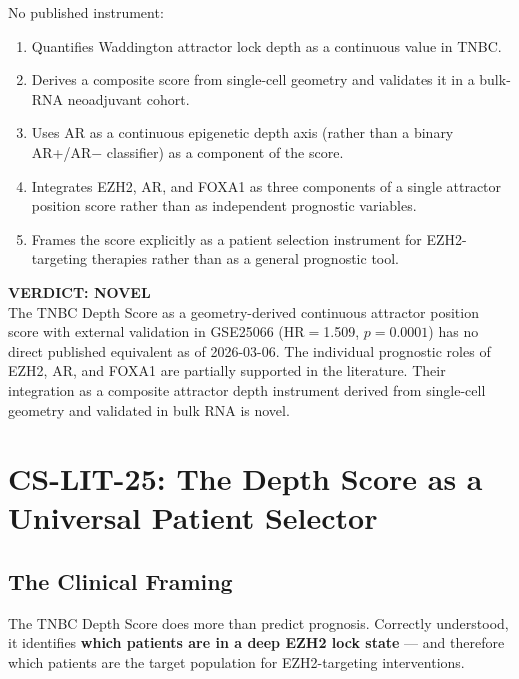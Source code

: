 \documentclass[12pt, a4paper]{article}
\begin{document}
No published instrument:
\begin{enumerate}
    \item Quantifies Waddington attractor lock
    depth as a continuous value in TNBC.
    \item Derives a composite score from
    single-cell geometry and validates it in
    a bulk-RNA neoadjuvant cohort.
    \item Uses AR as a continuous epigenetic
    depth axis (rather than a binary AR+/AR$-$
    classifier) as a component of the score.
    \item Integrates EZH2, AR, and FOXA1 as
    three components of a single attractor
    position score rather than as independent
    prognostic variables.
    \item Frames the score explicitly as a
    patient selection instrument for
    EZH2-targeting therapies rather than
    as a general prognostic tool.
\end{enumerate}

\begin{center}
\colorbox{novelbox}{
\begin{minipage}{0.88\textwidth}
\vspace{0.5em}
\textbf{VERDICT: NOVEL}\\[0.3em]
The TNBC Depth Score as a geometry-derived
continuous attractor position score with
external validation in GSE25066
(HR$=$1.509, $p=0.0001$) has no direct
published equivalent as of 2026-03-06.
The individual prognostic roles of EZH2, AR,
and FOXA1 are partially supported in the
literature. Their integration as a composite
attractor depth instrument derived from
single-cell geometry and validated in bulk RNA
is novel.
\vspace{0.5em}
\end{minipage}}
\end{center}

\section{CS-LIT-25: The Depth Score as a
Universal Patient Selector}

\subsection{The Clinical Framing}

The TNBC Depth Score does more than predict
prognosis. Correctly understood, it identifies
\textbf{which patients are in a deep EZH2 lock
state} --- and therefore which patients are the
target population for EZH2-targeting
interventions.
\end{document}
